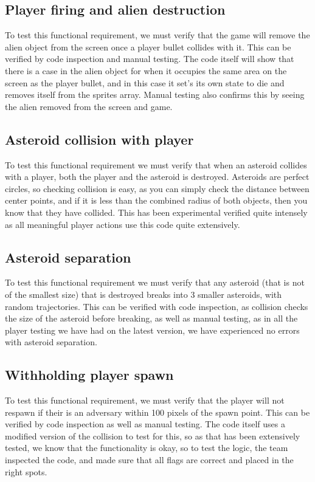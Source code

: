 \documentclass[12pt, titlepage]{article}
\begin{document}
\subsection{Player firing and alien destruction}
To test this functional requirement, we must verify that the game will remove the alien object from the screen once a player bullet collides with it. This can be verified by code inspection and manual testing. The code itself will show that there is a case in the alien object for when it occupies the same area on the screen as the player bullet, and in this case it set's its own state to die and removes itself from the sprites array. Manual testing also confirms this by seeing the alien removed from the screen and game. \\
\subsection{Asteroid collision with player}
To test this functional requirement we must verify that when an asteroid collides with a player, both the player and the asteroid is destroyed. Asteroids are perfect circles, so checking collision is easy, as you can simply check the distance between center points, and if it is less than the combined radius of both objects, then you know that they have collided. This has been experimental verified quite intensely as all meaningful player actions use this code quite extensively.\\
\subsection{Asteroid separation}
To test this functional requirement we must verify that any asteroid (that is not of the smallest size) that is destroyed breaks into 3 smaller asteroids, with random trajectories. This can be verified with code inspection, as collision checks the size of the asteroid before breaking, as well as manual testing, as in all the player testing we have had on the latest version, we have experienced no errors with asteroid separation.
\subsection{Withholding player spawn}
To test this functional requirement, we must verify that the player will not respawn if their is an adversary within 100 pixels of the spawn point. This can be verified by code inspection as well as manual testing. The code itself uses a modified version of the collision to test for this, so as that has been extensively tested, we know that the functionality is okay, so to test the logic, the team inspected the code, and made sure that all flags are correct and placed in the right spots.
\end{document}
